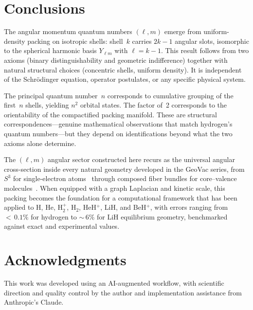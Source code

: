 \documentclass[aps,prl,reprint,amsmath,amssymb]{revtex4-2}
\begin{document}
\section{Conclusions}
\label{sec:conclusions}

The angular momentum quantum numbers $(\ell, m)$ emerge from
uniform-density packing on isotropic shells: shell~$k$ carries
$2k - 1$ angular slots, isomorphic to the spherical harmonic basis
$Y_{\ell m}$ with $\ell = k - 1$.  This result follows from two
axioms (binary distinguishability and geometric indifference) together
with natural structural choices (concentric shells, uniform density).
It is independent of the Schr\"odinger equation, operator postulates,
or any specific physical system.

The principal quantum number~$n$ corresponds to cumulative grouping of
the first~$n$ shells, yielding $n^2$ orbital states.  The factor of~2
corresponds to the orientability of the compactified packing manifold.
These are structural correspondences---genuine mathematical
observations that match hydrogen's quantum numbers---but they depend
on identifications beyond what the two axioms alone determine.

The $(\ell, m)$ angular sector constructed here recurs as the
universal angular cross-section inside every natural geometry developed
in the GeoVac series, from $S^3$ for single-electron
atoms~\cite{paper7} through composed fiber bundles for core--valence
molecules~\cite{paper17}.  When equipped with a graph Laplacian and
kinetic scale, this packing becomes the foundation for a computational
framework that has been applied to H, He, H$_2^+$, H$_2$, HeH$^+$,
LiH, and BeH$^+$, with errors ranging from ${<}\,0.1\%$ for hydrogen
to ${\sim}\,6\%$ for LiH equilibrium geometry, benchmarked against
exact and experimental values.


\section*{Acknowledgments}

This work was developed using an AI-augmented workflow, with
scientific direction and quality control by the author and
implementation assistance from Anthropic's Claude.
\end{document}
